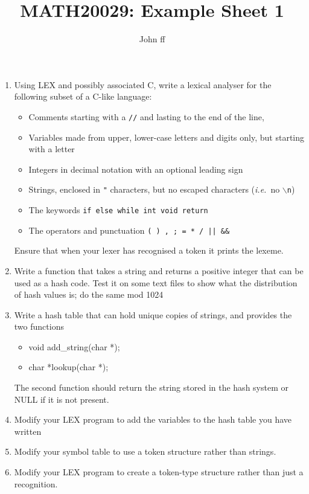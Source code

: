 
\title{ \large \bf MATH20029: Example Sheet 1}
\author{John ff}
\maketitle
\setlength{\parskip}{0.2in}

\vskip -1in

\begin{enumerate}
\item  Using LEX and possibly associated C, write a lexical analyser
  for the following subset of a C-like language:
  \begin{itemize}
    \item Comments starting with a {\tt //} and lasting to the end of the
      line, 
    \item Variables made from upper, lower-case letters and digits only,
      but starting with a letter
    \item Integers in decimal notation with an optional leading sign
    \item Strings, enclosed in {\tt "} characters, but no escaped
      characters ({\em i.e.}~no {\tt $\backslash$n})
    \item The keywords {\tt if else while int void return}
    \item The operators and punctuation {\tt ( ) , ; = * / || \&\& }
  \end{itemize}
  Ensure that when your lexer has recognised a token it prints the
  lexeme.

  \item Write a function that takes a string and returns a positive
  integer that can be used as a hash code.  Test it on some text files
  to show what the distribution of hash values is; do the same mod
  1024

  \item Write a hash table that can hold unique copies of strings, and
    provides the two functions
    \begin{itemize}
    \item void add\_string(char *);
    \item char *lookup(char *);
    \end{itemize}
    The second function should return the string stored in the hash
    system or NULL if it is not present.

    \item Modify your LEX program to add the variables to the hash
    table you have written

    \item Modify your symbol table to use a token structure rather
    than strings.

    \item Modify your LEX program to create a token-type structure
    rather than just a recognition.

\end{enumerate}



